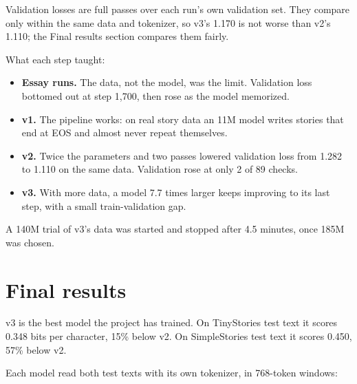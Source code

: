 \documentclass[11pt,a4paper]{article}
\begin{document}
Validation losses are full passes over each run's own validation set. They compare only within the same data and tokenizer, so v3's 1.170 is not worse than v2's 1.110; the Final results section compares them fairly.

What each step taught:

\begin{itemize}
\item \textbf{Essay runs.} The data, not the model, was the limit. Validation loss bottomed out at step 1,700, then rose as the model memorized.
\item \textbf{v1.} The pipeline works: on real story data an 11M model writes stories that end at EOS and almost never repeat themselves.
\item \textbf{v2.} Twice the parameters and two passes lowered validation loss from 1.282 to 1.110 on the same data. Validation rose at only 2 of 89 checks.
\item \textbf{v3.} With more data, a model 7.7 times larger keeps improving to its last step, with a small train-validation gap.
\end{itemize}

A 140M trial of v3's data was started and stopped after 4.5 minutes, once 185M was chosen.

\section*{Final results}
{}

v3 is the best model the project has trained. On TinyStories test text it scores 0.348 bits per character, 15\% below v2. On SimpleStories test text it scores 0.450, 57\% below v2.

Each model read both test texts with its own tokenizer, in 768-token windows:
\end{document}
